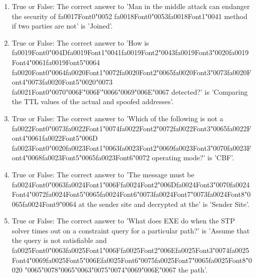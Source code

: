\documentclass[12pt]{article}
\begin{document}
\begin{enumerate}[label=\arabic*.]
\item True or False: The correct answer to 'Man in the middle attack can endanger the security of {\csname fa0017Font0\endcsname\char"0052} {\csname fa0018Font0\endcsname\char"0053}{\csname fa0018Font1\endcsname\char"0041} method if two parties are not' is 'Joined'.
\item True or False: The correct answer to 'How is {\csname fa0019Font0\endcsname\char"004D}{\csname fa0019Font1\endcsname\char"0041}{\csname fa0019Font2\endcsname\char"0043}{\csname fa0019Font3\endcsname\char"0020}{\csname fa0019Font4\endcsname\char"0061}{\csname fa0019Font5\endcsname\char"0064} {\csname fa0020Font0\endcsname\char"0064}{\csname fa0020Font1\endcsname\char"0072}{\csname fa0020Font2\endcsname\char"0065}{\csname fa0020Font3\endcsname\char"0073}{\csname fa0020Font4\endcsname\char"0073}{\csname fa0020Font5\endcsname\char"0020}{\char"0073} {\csname fa0021Font0\endcsname\char"0070}{\char"006F}{\char"006F}{\char"0066}{\char"0069}{\char"006E}{\char"0067} detected?' is 'Comparing the TTL values of the actual and spoofed addresses'.
\item True or False: The correct answer to 'Which of the following is not a {\csname fa0022Font0\endcsname\char"0073}{\csname fa0022Font1\endcsname\char"0074}{\csname fa0022Font2\endcsname\char"0072}{\csname fa0022Font3\endcsname\char"0065}{\csname fa0022Font4\endcsname\char"0061}{\csname fa0022Font5\endcsname\char"006D} {\csname fa0023Font0\endcsname\char"0020}{\csname fa0023Font1\endcsname\char"0063}{\csname fa0023Font2\endcsname\char"0069}{\csname fa0023Font3\endcsname\char"0070}{\csname fa0023Font4\endcsname\char"0068}{\csname fa0023Font5\endcsname\char"0065}{\csname fa0023Font6\endcsname\char"0072} operating mode?' is 'CBF'.
\item True or False: The correct answer to 'The message must be {\csname fa0024Font0\endcsname\char"0063}{\csname fa0024Font1\endcsname\char"006F}{\csname fa0024Font2\endcsname\char"006D}{\csname fa0024Font3\endcsname\char"0070}{\csname fa0024Font4\endcsname\char"0072}{\csname fa0024Font5\endcsname\char"0065}{\csname fa0024Font6\endcsname\char"0073}{\csname fa0024Font7\endcsname\char"0073}{\csname fa0024Font8\endcsname\char"0065}{\csname fa0024Font9\endcsname\char"0064} at the sender site and decrypted at the' is 'Sender Site'.
\item True or False: The correct answer to 'What does EXE do when the STP solver times out on a constraint query for a particular path?' is 'Assume that the query is not satisfiable and {\csname fa0025Font0\endcsname\char"0063}{\csname fa0025Font1\endcsname\char"006F}{\csname fa0025Font2\endcsname\char"006E}{\csname fa0025Font3\endcsname\char"0074}{\csname fa0025Font4\endcsname\char"0069}{\csname fa0025Font5\endcsname\char"006E}{\csname fa0025Font6\endcsname\char"0075}{\csname fa0025Font7\endcsname\char"0065}{\csname fa0025Font8\endcsname\char"0020} {\char"0065}{\char"0078}{\char"0065}{\char"0063}{\char"0075}{\char"0074}{\char"0069}{\char"006E}{\char"0067} the path'.
\end{enumerate}
\end{document}
